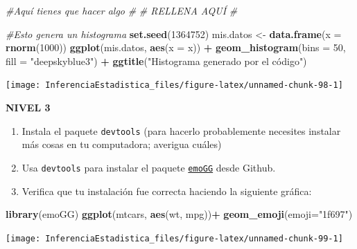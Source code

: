 \documentclass[
]{book}
\newenvironment{Shaded}{\begin{snugshade}}{\end{snugshade}}
\newcommand{\CommentTok}[1]{\textcolor[rgb]{0.56,0.35,0.01}{\textit{#1}}}
\newcommand{\DataTypeTok}[1]{\textcolor[rgb]{0.13,0.29,0.53}{#1}}
\newcommand{\DecValTok}[1]{\textcolor[rgb]{0.00,0.00,0.81}{#1}}
\newcommand{\KeywordTok}[1]{\textcolor[rgb]{0.13,0.29,0.53}{\textbf{#1}}}
\newcommand{\NormalTok}[1]{#1}
\newcommand{\OperatorTok}[1]{\textcolor[rgb]{0.81,0.36,0.00}{\textbf{#1}}}
\newcommand{\StringTok}[1]{\textcolor[rgb]{0.31,0.60,0.02}{#1}}
\providecommand{\tightlist}{%
  \setlength{\itemsep}{0pt}\setlength{\parskip}{0pt}}
\begin{document}
\begin{Shaded}
\begin{Highlighting}[]
\CommentTok{#Aquí tienes que hacer algo}
\CommentTok{#}
\CommentTok{# RELLENA AQUÍ}
\CommentTok{#}

\CommentTok{#Esto genera un histograma}
\KeywordTok{set.seed}\NormalTok{(}\DecValTok{1364752}\NormalTok{)}
\NormalTok{mis.datos <-}\StringTok{ }\KeywordTok{data.frame}\NormalTok{(}\DataTypeTok{x =} \KeywordTok{rnorm}\NormalTok{(}\DecValTok{1000}\NormalTok{))}
\KeywordTok{ggplot}\NormalTok{(mis.datos, }\KeywordTok{aes}\NormalTok{(}\DataTypeTok{x =}\NormalTok{ x)) }\OperatorTok{+}\StringTok{ }
\StringTok{  }\KeywordTok{geom_histogram}\NormalTok{(}\DataTypeTok{bins =} \DecValTok{50}\NormalTok{, }\DataTypeTok{fill =} \StringTok{"deepskyblue3"}\NormalTok{) }\OperatorTok{+}
\StringTok{  }\KeywordTok{ggtitle}\NormalTok{(}\StringTok{"Histograma generado por el código")}
\end{Highlighting}
\end{Shaded}

\begin{center}\texttt{[image: InferenciaEstadistica\_files/figure-latex/unnamed-chunk-98-1]} \end{center}

\textbf{NIVEL 3}

\begin{enumerate}
\def\labelenumi{\arabic{enumi}.}
\tightlist
\item
  Instala el paquete \texttt{devtools} (para hacerlo probablemente necesites instalar más cosas en tu computadora; averigua cuáles)
\item
  Usa \texttt{devtools} para instalar el paquete \href{https://github.com/dill/emoGG}{\texttt{emoGG}} desde Github.
\item
  Verifica que tu instalación fue correcta haciendo la siguiente gráfica:
\end{enumerate}

\begin{Shaded}
\begin{Highlighting}[]
\KeywordTok{library}\NormalTok{(emoGG)}
\KeywordTok{ggplot}\NormalTok{(mtcars, }\KeywordTok{aes}\NormalTok{(wt, mpg))}\OperatorTok{+}\StringTok{ }\KeywordTok{geom_emoji}\NormalTok{(}\DataTypeTok{emoji=}\StringTok{"1f697"}\NormalTok{)}
\end{Highlighting}
\end{Shaded}

\begin{center}\texttt{[image: InferenciaEstadistica\_files/figure-latex/unnamed-chunk-99-1]} \end{center}
\end{document}
